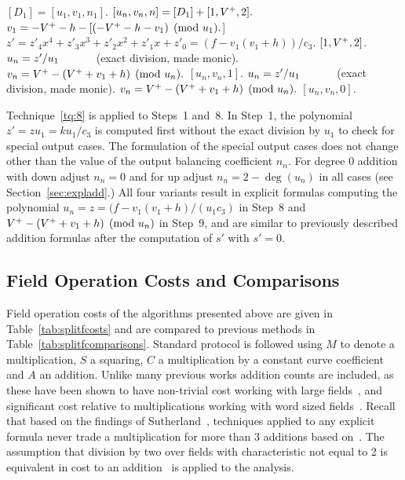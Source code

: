 \begin{algorithm}[htbp]
\caption{Genus 2 Split Model Degree 0 Add with Up Adjust\label{alg:explSPLIT0ADDUP}}
\begin{algorithmic} [1]
\Require $[D_1] = [u_1, v_1, n_1]$. \smallskip
\Ensure $[u_n,v_n,n] = [D_1] + [1,V^{+},2].$
\algrule
\setcounter{ALG@line}{-1}
\State $v_1 =  -V^{+} - h - [(-V^{+} - h - v_1) \pmod{u_1}.$]
\State $z' = z'_4x^4 + z'_3x^3 + z'_2x^2 + z'_1x + z'_0 = (f - v_1(v_1 + h))/c_3$.
     \Return $[1, V^{+},2]$.
    \Else \hspace{4pt}
        \State $u_n = z'/u_1 \quad\quad\quad$ (exact division, made monic).
        \State $v_n =  V^{+} - (V^{+} + v_1 + h) \pmod{u_n}.$
        \State \Return $[u_n,v_n,1]$.
    \EndIf
\EndIf
\State $u_n = z'/u_1 \quad\quad\quad$ (exact division, made monic).
\State $v_n =  V^{+} - (V^{+} + v_1 + h) \pmod{u_n}.$
\State \Return $[u_n,v_n,0]$.
\end{algorithmic}
\end{algorithm}

Technique~\ref{tq:8} is applied to Steps~1 and~8. In Step~1, the polynomial $z'
= zu_1 = ku_1/c_3$ is computed first without the exact division by $u_1$ to
check for special output cases. The formulation of the special output cases
does not change other than the value of the output balancing coefficient $n_n$.
For degree 0 addition with down adjust $n_n = 0$ and for up adjust $n_n = 2 -
\deg(u_n)$ in all cases (see Section~\ref{sec:expladd}.) All four variants
result in explicit formulas computing the polynomial $u_n = z = (f-v_1(v_1 +
h)/(u_1c_3)$ in Step~8 and $V^{+} - (V^{+} + v_1 + h) \pmod{u_n}$ in Step~9, and are
similar to previously described addition formulas after the computation of $s'$
with $s' = 0$.

\subsection{Field Operation Costs and Comparisons}
\label{sec:splitFieldCosts}
Field operation costs of the algorithms presented above are given in
Table~\ref{tab:splitfcosts} and are compared to previous methods in
Table~\ref{tab:splitfcomparisons}. Standard protocol is followed using $M$ to
denote a multiplication, $S$ a squaring, $C$ a multiplication by a constant
curve coefficient and $A$ an addition. Unlike many previous works addition
counts are included, as these have been shown to have non-trivial cost working
with large fields~\cite{HisilCostello_jaccoord_2014}, and significant cost
relative to multiplications working with word sized
fields~\cite{Sutherland_sato_2016}. Recall that based on the findings of
Sutherland~\cite{Sutherland_sato_2016,Sutherland_g3_2019}, techniques applied to
any explicit formula never trade a multiplication for more than 3 additions
based on~\cite{Sutherland_sato_2016}. The assumption that division by two over
fields with characteristic not equal to 2 is equivalent in cost to an
addition~\cite{Sutherland_g3_2019} is applied to the analysis. 


